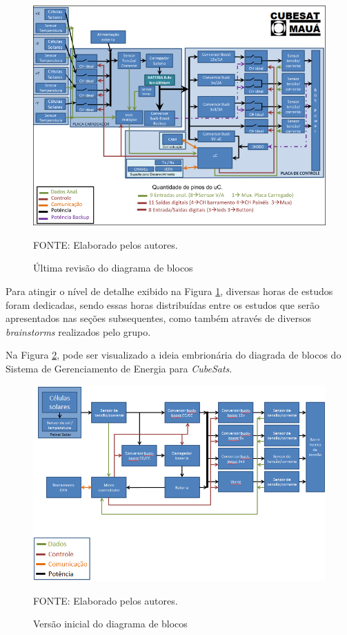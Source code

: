 \documentclass[
	12pt,				%
	openright,			%
	oneside,			%
	a4paper,			%
	english,			%
	french,				%
	spanish,			%
	brazil,				%
	oldfontcommands
	]{abntex2}
\begin{document}
	\begin{figure}[th]
		\caption{Última revisão do diagrama de blocos}
		\label{Fig_Diag_Blocos_Final}
		\centering
		\includegraphics[width=1.0\linewidth]{./figs/diag_blocos}
			
		\begin{small}
			FONTE: Elaborado pelos autores.
		\end{small}		
	\end{figure}
	\pagebreak
	
	Para atingir o nível de detalhe exibido na Figura \ref{Fig_Diag_Blocos_Final}, diversas horas de estudos foram dedicadas, sendo essas horas distribuídas entre os estudos que serão apresentados nas seções subsequentes, como também através de diversos \textit{brainstorms} realizados pelo grupo.
	
	Na Figura \ref{Fig_Diag_Blocos_Inicial}, pode ser visualizado a ideia embrionária do diagrada de blocos do Sistema de Gerenciamento de Energia para \textit{CubeSats}.
		
	\begin{figure}[th]
		\caption{Versão inicial do diagrama de blocos}
		\label{Fig_Diag_Blocos_Inicial}
		\centering
		\includegraphics[width=1.0\linewidth]{./figs/diag_blocos_inicial}
			
		\begin{small}
			FONTE: Elaborado pelos autores.
		\end{small}		
	\end{figure}	
	\pagebreak
\end{document}
